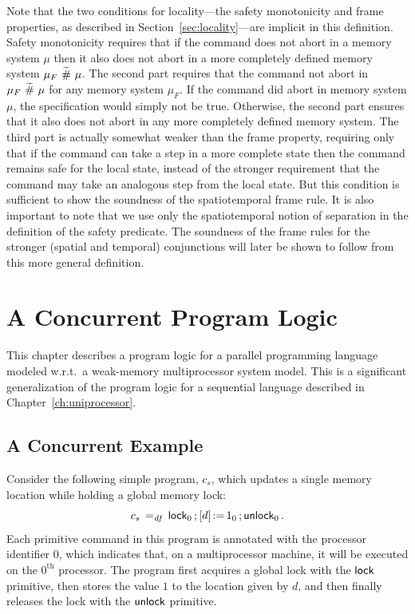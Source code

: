 \documentclass[11pt]{report}
\begin{document}
Note that the two conditions for locality---the safety monotonicity and frame properties, as described in Section~\ref{sec:locality}---are implicit in this definition. Safety monotonicity requires that if the command does not abort in a memory system $\mu$ then it also does not abort in a more completely defined memory system $\mu_F \operatorname{\,\widetilde{\#}\,} \mu$. The second part requires that the command not abort in $\mu_F \operatorname{\,\widetilde{\#}\,} \mu$ for any memory system $\mu_F$. If the command did abort in memory system $\mu$, the specification would simply not be true. Otherwise, the second part ensures that it also does not abort in any more completely defined memory system. The third part is actually somewhat weaker than the frame property, requiring only that if the command can take a step in a more complete state then the command remains safe for the local state, instead of the stronger requirement that the command may take an analogous step from the local state. But this condition is sufficient to show the soundness of the spatiotemporal frame rule. It is also important to note that we use only the spatiotemporal notion of separation in the definition of the safety predicate. The soundness of the frame rules for the stronger (spatial and temporal) conjunctions will later be shown to follow from this more general definition.

\chapter{A Concurrent Program Logic}
\label{ch:multiprocessor}

This chapter describes a program logic for a parallel programming language modeled w.r.t.\ a weak-memory multiprocessor system model. This is a significant generalization of the program logic for a sequential language described in Chapter~\ref{ch:uniprocessor}. 

\section{A Concurrent Example}
\label{sec:concurrent-example}

Consider the following simple program, $c_s$, which updates a single memory location while holding a global memory lock: \[ c_s \operatorname{\;=_{\mathit{df}}\;} \operatorname{\mathsf{lock}}_0 \operatorname{;} \left[ d \right] \operatorname{:\!=} 1_0 \operatorname{;} \operatorname{\mathsf{unlock}}_0. \] Each primitive command in this program is annotated with the processor identifier $0$, which indicates that, on a multiprocessor machine, it will be executed on the $0^{\mathrm{th}}$ processor. The program first acquires a global lock with the $\operatorname{\mathsf{lock}}$
 primitive, then stores the value $1$ to the location given by $d$, and then finally releases the lock with the $\operatorname{\mathsf{unlock}}$ primitive. 
\end{document}
